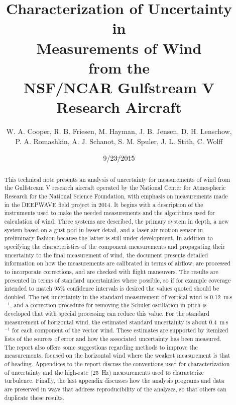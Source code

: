 \documentclass[12pt,twoside,english]{article}\usepackage[]{graphicx}\usepackage[]{color}
\providecommand{\DIFadd}[1]{{\protect\color{blue}\uwave{#1}}} %
\providecommand{\DIFdel}[1]{{\protect\color{red}\sout{#1}}}                      %
\providecommand{\DIFaddbegin}{} %
\providecommand{\DIFaddend}{} %
\providecommand{\DIFdelbegin}{} %
\providecommand{\DIFdelend}{} %
\begin{document}
\title{Characterization of Uncertainty \\
 in \\Measurements of Wind\\
 from the \\NSF/NCAR Gulfstream V Research Aircraft}


\author{W. A. Cooper, R. B. Friesen, M. Hayman, J. B. Jensen, D. H. Lenschow, \\P. A. Romashkin, A. J. Schanot, S. M. Spuler, J. L. Stith, C. Wolff}


\date{\textcolor{red}{} \DIFaddbegin \DIFadd{5/}\DIFaddend 9/\DIFdelbegin \DIFdel{23/2015}\DIFdelend \DIFaddbegin \DIFadd{2016}\DIFaddend }
\thispagestyle{empty}
\maketitle
\vfill{}
\eject%
\cleardoublepage
{}



\begin{abstract}

This technical note presents an analysis of uncertainty for measurements
of wind from the Gulfstream V research aircraft operated by the National
Center for Atmospheric Research for the National Science Foundation,
with emphasis on measurements made in the DEEPWAVE field project in
2014. It begins with a description of the instruments used to make
the needed measurements and the algorithms used for calculation of
wind. Three systems are described, the primary system in depth, a
new system based on a gust pod in lesser detail, and a laser air motion
sensor in preliminary fashion because the latter is still under development.
In addition to specifying the characteristics of the component measurements
and propagating their uncertainty to the final measurement of wind,
the document presents detailed information on how the measurements
are calibrated in terms of airflow, are processed to incorporate corrections,
and are checked with flight maneuvers. The results are presented in
terms of standard uncertainties where possible, so if for example
coverage intended to match 95\% confidence intervals is desired the
values quoted should be doubled. The net uncertainty in the standard
measurement of vertical wind is 0.12~m\,s$^{-1}$, and a correction
procedure for removing the Schuler oscillation in pitch is developed
that with special processing can reduce this value. For the standard
measurement of horizontal wind, the estimated standard uncertainty
is about 0.4~m\,s$^{-1}$ for each component of the vector wind.
These estimates are supported by itemized lists of the sources of
error and how the associated uncertainty has been measured. The report
also offers some suggestions regarding methods to improve the measurements,
focused on the horizontal wind where the weakest measurement is that
of heading. Appendices to the report discuss the conventions used
for characterization of uncertainty and the high-rate (25~Hz) measurements
used to characterize turbulence. Finally, the last appendix discusses
how the analysis programs and data are preserved in ways that address
reproducibility of the analyses, so that others can duplicate these
results.
\end{abstract}
\clearpage
\end{document}

